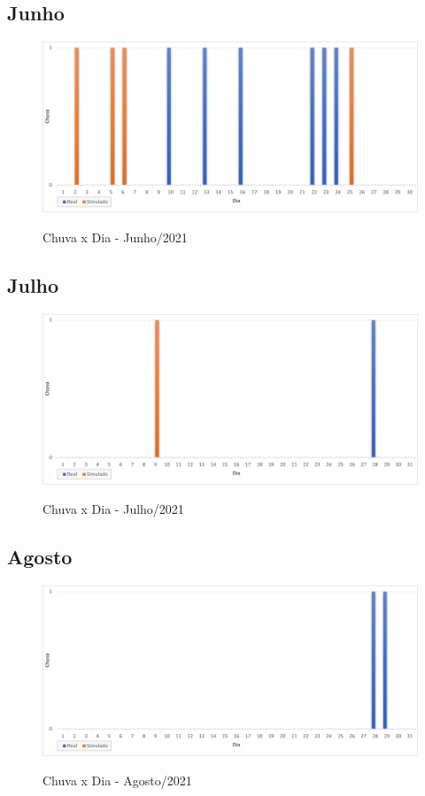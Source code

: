 \subsection{Junho}
\begin{figure}[H]
	\caption{\small Chuva x Dia - Junho/2021}
	\centering
	\includegraphics[width=\textwidth]{figs/jun.png}
	\label{f.rjun}
\end{figure}

\subsection{Julho}
\begin{figure}[H]
	\caption{\small Chuva x Dia - Julho/2021}
	\centering
	\includegraphics[width=\textwidth]{figs/jul.png}
	\label{f.rjul}
\end{figure}

\subsection{Agosto}
\begin{figure}[H]
	\caption{\small Chuva x Dia - Agosto/2021}
	\centering
	\includegraphics[width=\textwidth]{figs/ago.png}
	\label{f.rago}
\end{figure}

